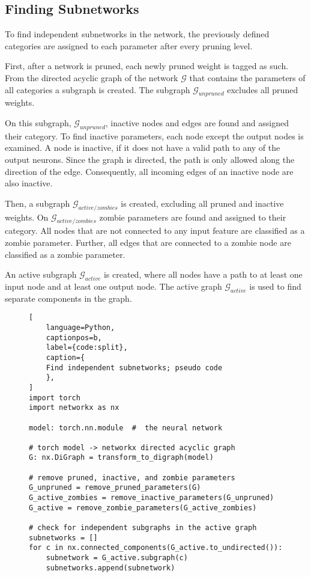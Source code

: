 \subsection{Finding Subnetworks}
To find independent subnetworks in the network, the previously defined categories are assigned to each parameter after every pruning level.

First, after a network is pruned, each newly pruned weight is tagged as such.
From the directed acyclic graph of the network $\mathcal{G}$ that contains the parameters of all categories a subgraph is created.
The subgraph $\mathcal{G}_{unpruned}$ excludes all pruned weights.

On this subgraph, $\mathcal{G}_{unpruned}$, inactive nodes and edges are found and assigned their category.
To find inactive parameters, each node except the output nodes is examined.
A node is inactive, if it does not have a valid path to any of the output neurons.
Since the graph is directed, the path is only allowed along the direction of the edge.
Consequently, all incoming edges of an inactive node are also inactive.

Then, a subgraph $\mathcal{G}_{active/zombies}$ is created, excluding all pruned and inactive weights.
On $\mathcal{G}_{active/zombies}$ zombie parameters are found and assigned to their category. 
All nodes that are not connected to any input feature are classified as a zombie parameter. 
Further, all edges that are connected to a zombie node are classified as a zombie parameter.

An active subgraph $\mathcal{G}_{active}$ is created, where all nodes have a path to at least one input node and at least one output node.
The active graph $\mathcal{G}_{active}$ is used to find separate components in the graph.

\begin{figure}[ht]
\centering
\begin{minipage}{\linewidth}
\begin{lstlisting}[
    language=Python,
    captionpos=b, 
    label={code:split},
    caption={
    Find independent subnetworks; pseudo code
    },
]
import torch
import networkx as nx

model: torch.nn.module  #  the neural network

# torch model -> networkx directed acyclic graph
G: nx.DiGraph = transform_to_digraph(model)

# remove pruned, inactive, and zombie parameters
G_unpruned = remove_pruned_parameters(G)
G_active_zombies = remove_inactive_parameters(G_unpruned)
G_active = remove_zombie_parameters(G_active_zombies)

# check for independent subgraphs in the active graph
subnetworks = []
for c in nx.connected_components(G_active.to_undirected()):
    subnetwork = G_active.subgraph(c)
    subnetworks.append(subnetwork)
\end{lstlisting}
\end{minipage}
\end{figure}

